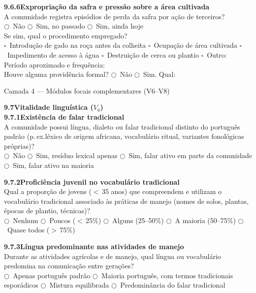 \medskip\noindent\textbf{9.6.6\quad Expropriação da safra e pressão sobre a área cultivada}\\[2pt]
A comunidade registra episódios de perda da safra por ação de terceiros?\\
$\bigcirc$~Não \quad $\bigcirc$~Sim, no passado \quad $\bigcirc$~Sim, ainda hoje\\[2pt]
Se sim, qual o procedimento empregado?\\
$\square$~Introdução de gado na roça antes da colheita \quad $\square$~Ocupação de área cultivada \quad $\square$~Impedimento de acesso à água \quad $\square$~Destruição de cerca ou plantio \quad $\square$~Outro: \dotfill\\[2pt]
Período aproximado e frequência: \dotfill\\[2pt]
Houve alguma providência formal? \quad $\bigcirc$~Não \quad $\bigcirc$~Sim. Qual: \dotfill

{Camada 4 --- Módulos focais complementares (V6--V8)}

\medskip\noindent\textbf{9.7\quad Vitalidade linguística ($V_6$)}\\[6pt]

\noindent\textbf{9.7.1\quad Existência de falar tradicional}\\[2pt]
A comunidade possui língua, dialeto ou falar tradicional distinto do português padrão (p.\,ex.\@ léxico de origem africana, vocabulário ritual, variantes fonológicas próprias)?\\
$\bigcirc$~Não \quad $\bigcirc$~Sim, resíduo lexical apenas \quad $\bigcirc$~Sim, falar ativo em parte da comunidade \quad $\bigcirc$~Sim, falar ativo na maioria

\medskip\noindent\textbf{9.7.2\quad Proficiência juvenil no vocabulário tradicional}\\[2pt]
Qual a proporção de jovens ($<$\,35 anos) que compreendem e utilizam o vocabulário tradicional associado às práticas de manejo (nomes de solos, plantas, épocas de plantio, técnicas)?\\
$\bigcirc$~Nenhum \quad $\bigcirc$~Poucos ($<$\,25\%) \quad $\bigcirc$~Alguns (25--50\%) \quad $\bigcirc$~A maioria (50--75\%) \quad $\bigcirc$~Quase todos ($>$\,75\%)

\medskip\noindent\textbf{9.7.3\quad Língua predominante nas atividades de manejo}\\[2pt]
Durante as atividades agrícolas e de manejo, qual língua ou vocabulário predomina na comunicação entre gerações?\\
$\bigcirc$~Apenas português padrão \quad $\bigcirc$~Maioria português, com termos tradicionais esporádicos \quad $\bigcirc$~Mistura equilibrada \quad $\bigcirc$~Predominância do falar tradicional

